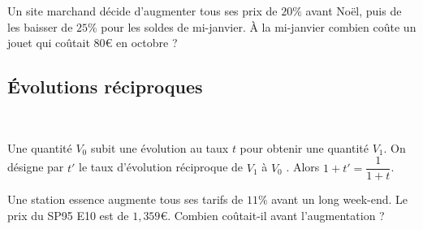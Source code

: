 \begin{Exemple}
Un site marchand décide d'augmenter tous ses prix de $20 \%$ avant Noël, puis de les baisser de $25 \%$ pour les soldes de mi-janvier.
À la mi-janvier combien coûte un jouet qui coûtait $80$€ en octobre ? 
\vspace{0.1cm}

\ligne

\ligne

\ligne

\ligne

\end{Exemple}

\subsection{Évolutions réciproques}

\begin{Propriété} $ $ \\
\begin{minipage}[c]{0.7\linewidth}
Une quantité $V_0$ subit une évolution au taux $t$ pour obtenir une quantité $V_1$. On désigne par $t'$ le taux d'évolution réciproque de $V_1$ à $V_0$ . Alors $1+t '=\dfrac{1}{1+t}$.
\end{minipage} \hfill
\begin{minipage}[c]{0.4\linewidth}
\begin{center}
\end{center}
\end{minipage}
\end{Propriété}

\begin{Exemple}
Une station essence augmente tous ses tarifs de $11\%$ avant un long week-end. Le prix du SP95 E10 est de $1,359$€. Combien coûtait-il avant l'augmentation ? 
\vspace{0.1cm}

\ligne

\ligne

\ligne

\ligne

\end{Exemple}

